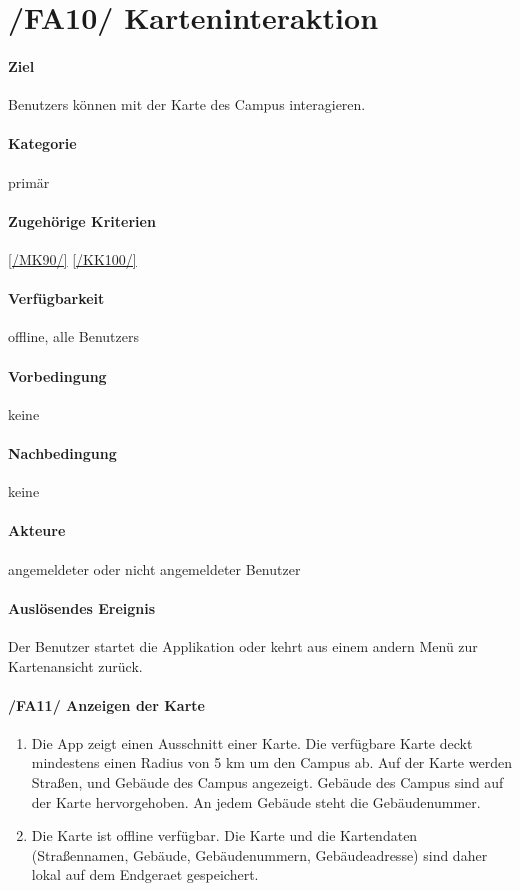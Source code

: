 \section[Karteninteraktion]{/FA10/ Karteninteraktion}
\label{/FA10/}
\paragraph{Ziel}
\Glspl{Benutzer} können mit der \Gls{Karte} des \Gls{Campus} interagieren.
\paragraph{Kategorie}
primär
\paragraph{Zugehörige Kriterien}
\ref{/MK90/} \ref{/KK100/}
\paragraph{Verfügbarkeit}
\gls{offline}, alle \Glspl{Benutzer}
\paragraph{Vorbedingung}
keine
\paragraph{Nachbedingung}
keine
\paragraph{Akteure}
angemeldeter oder nicht angemeldeter \Gls{Benutzer}
\paragraph{Auslösendes Ereignis}
Der \Gls{Benutzer} startet die Applikation oder kehrt aus einem andern Menü zur \Gls{Kartenansicht} zurück.
\paragraph{/FA11/ Anzeigen der Karte}\label{/FA11/}
\begin{enumerate}
    \item Die App zeigt einen Ausschnitt einer \Gls{Karte}. Die verfügbare \Gls{Karte} deckt mindestens einen Radius von 5 km um den \Gls{Campus} ab. Auf der \Gls{Karte} werden Straßen, und Gebäude des \Gls{Campus} angezeigt. Gebäude des \Gls{Campus} sind auf der \Gls{Karte} hervorgehoben. An jedem Gebäude steht die Gebäudenummer.
    \item Die \Gls{Karte} ist \gls{offline} verfügbar. Die \Gls{Karte} und die Kartendaten (Straßennamen, Gebäude, Gebäudenummern, Gebäudeadresse) sind daher \gls{lokal} auf dem \Gls{Endgeraet} gespeichert.
\end{enumerate}
